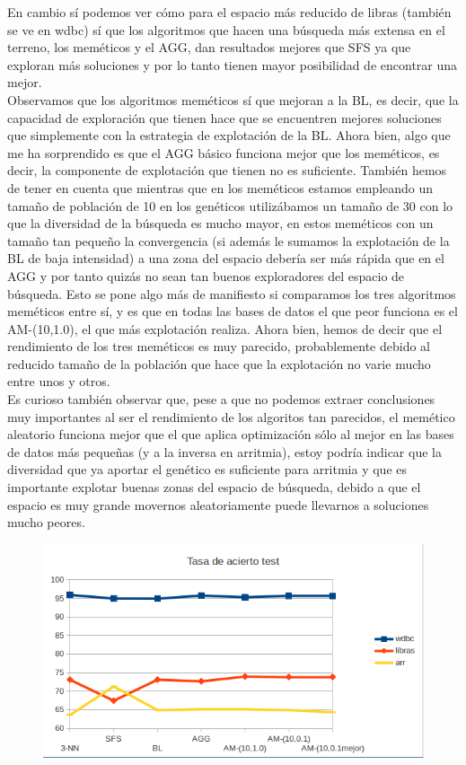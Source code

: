 \documentclass[10pt,a4paper]{article}
\begin{document}
En cambio sí podemos ver cómo para el espacio más reducido de libras (también se ve en wdbc) sí que los algoritmos que hacen una búsqueda más extensa en el terreno, los meméticos y el AGG, dan resultados mejores que SFS ya que exploran más soluciones y por lo tanto tienen mayor posibilidad de encontrar una mejor.\\

Observamos que los algoritmos meméticos sí que mejoran a la BL, es decir, que la capacidad de exploración que tienen hace que se encuentren mejores soluciones que simplemente con la estrategia de explotación de la BL. Ahora bien, algo que me ha sorprendido es que el AGG básico funciona mejor que los meméticos, es decir, la componente de explotación que tienen no es suficiente. También hemos de tener en cuenta que mientras que en los meméticos estamos empleando un tamaño de población de 10 en los genéticos utilizábamos un tamaño de 30 con lo que la diversidad de la búsqueda es mucho mayor, en estos meméticos con un tamaño tan pequeño la convergencia (si además le sumamos la explotación de la BL de baja intensidad) a una zona del espacio debería ser más rápida que en el AGG y por tanto quizás no sean tan buenos exploradores del espacio de búsqueda. Esto se pone algo más de manifiesto si comparamos los tres algoritmos meméticos entre sí, y es que en todas las bases de datos el que peor funciona es el AM-(10,1.0), el que más explotación realiza. Ahora bien, hemos de decir que el rendimiento de los tres meméticos es muy parecido, probablemente debido al reducido tamaño de la población que hace que la explotación no varie mucho entre unos y otros.\\

Es curioso también observar que, pese a que no podemos extraer conclusiones muy importantes al ser el rendimiento de los algoritos tan parecidos, el memético aleatorio funciona mejor que el que aplica optimización sólo al mejor en las bases de datos más pequeñas (y a la inversa en arritmia), estoy podría indicar que la diversidad que ya aportar el genético es suficiente para arritmia y que es importante explotar buenas zonas del espacio de búsqueda, debido a que el espacio es muy grande movernos aleatoriamente puede llevarnos a soluciones mucho peores.\\


\begin{figure}[H]
\centering
\includegraphics[width=130mm]{tasa_test_am.png}
\end{figure}
\end{document}
